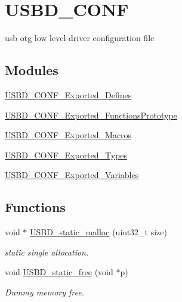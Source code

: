\hypertarget{group___u_s_b_d___c_o_n_f}{}\section{U\+S\+B\+D\+\_\+\+C\+O\+NF}
\label{group___u_s_b_d___c_o_n_f}


usb otg low level driver configuration file  


\subsection*{Modules}
\begin{DoxyCompactItemize}
\item 
\mbox{\hyperlink{group___u_s_b_d___c_o_n_f___exported___defines}{U\+S\+B\+D\+\_\+\+C\+O\+N\+F\+\_\+\+Exported\+\_\+\+Defines}}
\item 
\mbox{\hyperlink{group___u_s_b_d___c_o_n_f___exported___functions_prototype}{U\+S\+B\+D\+\_\+\+C\+O\+N\+F\+\_\+\+Exported\+\_\+\+Functions\+Prototype}}
\item 
\mbox{\hyperlink{group___u_s_b_d___c_o_n_f___exported___macros}{U\+S\+B\+D\+\_\+\+C\+O\+N\+F\+\_\+\+Exported\+\_\+\+Macros}}
\item 
\mbox{\hyperlink{group___u_s_b_d___c_o_n_f___exported___types}{U\+S\+B\+D\+\_\+\+C\+O\+N\+F\+\_\+\+Exported\+\_\+\+Types}}
\item 
\mbox{\hyperlink{group___u_s_b_d___c_o_n_f___exported___variables}{U\+S\+B\+D\+\_\+\+C\+O\+N\+F\+\_\+\+Exported\+\_\+\+Variables}}
\end{DoxyCompactItemize}
\subsection*{Functions}
\begin{DoxyCompactItemize}
\item 
void $\ast$ \mbox{\hyperlink{group___u_s_b_d___c_o_n_f_ga2df01b9aae6026e9f6b55da3b1e72aee}{U\+S\+B\+D\+\_\+static\+\_\+malloc}} (uint32\+\_\+t size)
\begin{DoxyCompactList}\small\item\em static single allocation. \end{DoxyCompactList}\item 
void \mbox{\hyperlink{group___u_s_b_d___c_o_n_f_ga92ed1214efe53f54b3586a6233cfa5a6}{U\+S\+B\+D\+\_\+static\+\_\+free}} (void $\ast$p)
\begin{DoxyCompactList}\small\item\em Dummy memory free. \end{DoxyCompactList}\end{DoxyCompactItemize}


